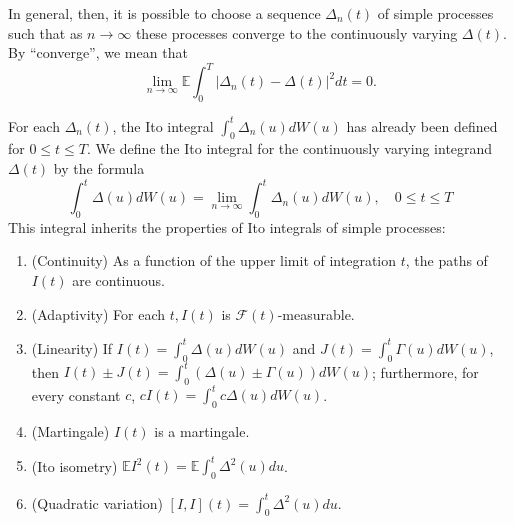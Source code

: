 \documentclass[\topdir/lecture\_notes.tex]{subfiles}
\begin{document}
In general, then, it is possible to choose a sequence \(\Delta_{n}(t)\) of simple processes such that as \(n \rightarrow \infty\) these processes converge to the continuously varying \(\Delta(t)\). By ``converge'', we mean that
\begin{equation*}
\lim _{n \rightarrow \infty} \mathbb{E} \int_{0}^{T}\left|\Delta_{n}(t)-\Delta(t)\right|^{2} dt=0.
\end{equation*}

For each \(\Delta_{n}(t)\), the Ito integral \(\int_{0}^{t} \Delta_{n}(u) d W(u)\) has already been defined for \(0 \leq t \leq T\). We define the Ito integral for the continuously varying integrand \(\Delta(t)\) by the formula
\begin{equation*}
\int_{0}^{t} \Delta(u) d W(u)=\lim _{n \rightarrow \infty} \int_{0}^{t} \Delta_{n}(u) d W(u), \quad 0 \leq t \leq T
\end{equation*}
This integral inherits the properties of Ito integrals of simple processes:
\begin{enumerate}[label=(\roman*)]
    \item (Continuity) As a function of the upper limit of integration \(t\), the paths of \(I(t)\) are continuous.
    
    \item (Adaptivity) For each \(t, I(t)\) is \(\mathcal{F}(t)\)-measurable.
    
    \item (Linearity) If \(I(t)=\int_{0}^{t} \Delta(u) d W(u)\) and \(J(t)=\int_{0}^{t} \Gamma(u) d W(u)\), then \(I(t) \pm J(t)=\int_{0}^{t}(\Delta(u) \pm \Gamma(u)) d W(u)\); furthermore, for every constant \(c\), \(c I(t)=\int_{0}^{t} c \Delta(u) d W(u)\).
    
    \item (Martingale) \(I(t)\) is a martingale.
    
    \item (Ito isometry) \(\mathbb{E} I^{2}(t)=\mathbb{E} \int_{0}^{t} \Delta^{2}(u) d u\).
    
    \item (Quadratic variation) \([I, I](t)=\int_{0}^{t} \Delta^{2}(u) d u\).
    \end{enumerate}
\end{document}
